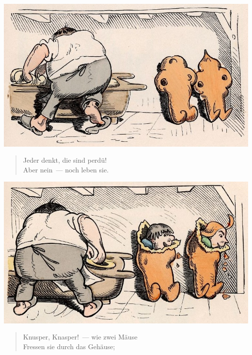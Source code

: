 \documentclass[a4paper,12pt]{article}
\begin{document}
\begin{center}\includegraphics[scale=.7, alt={Noch leben sie}]{images/6-14.jpg}\end{center}



\begin{verse}
Jeder denkt, die sind perdü!\\{}
Aber nein~— noch leben sie.
\end{verse}



\begin{center}\includegraphics[scale=.7, alt={Knusper, Knasper}]{images/6-15.jpg}\end{center}



\begin{verse}
Knusper, Knasper!~— wie zwei Mäuse\\{}
Fressen sie durch das Gehäuse;
\end{verse}
\end{document}
